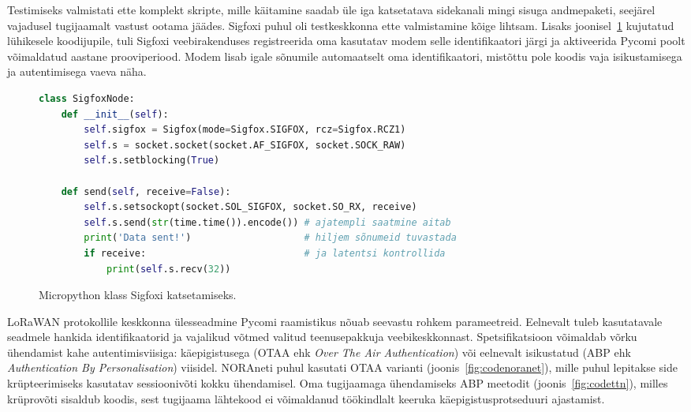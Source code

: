 \documentclass[12pt]{article}
\begin{document}
    Testimiseks valmistati ette komplekt skripte, mille käitamine saadab üle iga katsetatava sidekanali mingi sisuga andmepaketi, seejärel vajadusel tugijaamalt vastust ootama jäädes.
    Sigfoxi puhul oli testkeskkonna ette valmistamine kõige lihtsam.
    Lisaks joonisel~\ref{fig:codesigfox} kujutatud lühikesele koodijupile, tuli Sigfoxi veebirakenduses registreerida oma kasutatav modem selle identifikaatori järgi ja aktiveerida Pycomi poolt võimaldatud aastane prooviperiood.
    Modem lisab igale sõnumile automaatselt oma identifikaatori, mistõttu pole koodis vaja isikustamisega ja autentimisega vaeva näha.
    \begin{figure}[h]
    \begin{spacing}{0.8}
    \begin{lstlisting}[language=Python]
class SigfoxNode:
    def __init__(self):
        self.sigfox = Sigfox(mode=Sigfox.SIGFOX, rcz=Sigfox.RCZ1)
        self.s = socket.socket(socket.AF_SIGFOX, socket.SOCK_RAW)
        self.s.setblocking(True)

    def send(self, receive=False):
        self.s.setsockopt(socket.SOL_SIGFOX, socket.SO_RX, receive)
        self.s.send(str(time.time()).encode()) # ajatempli saatmine aitab
        print('Data sent!')                    # hiljem sõnumeid tuvastada
        if receive:                            # ja latentsi kontrollida
            print(self.s.recv(32))
    \end{lstlisting}
    \end{spacing}
    \caption{Micropython klass Sigfoxi katsetamiseks.}
    \label{fig:codesigfox}
    \end{figure}

    LoRaWAN protokollile keskkonna ülesseadmine Pycomi raamistikus nõuab seevastu rohkem parameetreid.
    Eelnevalt tuleb kasutatavale seadmele hankida identifikaatorid ja vajalikud võtmed valitud teenusepakkuja veebikeskkonnast.
    Spetsifikatsioon võimaldab võrku ühendamist kahe autentimisviisiga: käepigistusega (OTAA ehk \textit{Over The Air Authentication}) või eelnevalt isikustatud (ABP ehk \textit{Authentication By Personalisation}) viisidel.
    NORAneti puhul kasutati OTAA varianti (joonis~\ref{fig:codenoranet}), mille puhul lepitakse side krüpteerimiseks kasutatav sessioonivõti kokku ühendamisel.
    Oma tugijaamaga ühendamiseks ABP meetodit (joonis~\ref{fig:codettn}), milles krüprovõti sisaldub koodis, sest tugijaama lähtekood ei võimaldanud töökindlalt keeruka käepigistusprotseduuri ajastamist.
\end{document}
